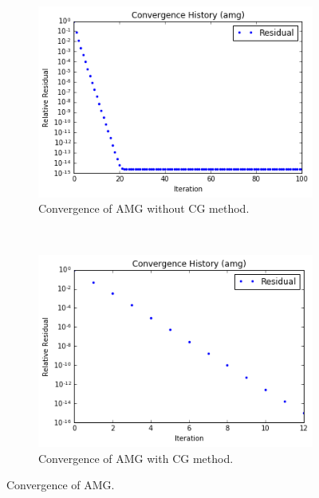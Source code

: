 \documentclass[a4paper,12pt]{article}
\begin{document}
\begin{figure}[h!]
  \centering
  \begin{subfigure}[b]{0.8\textwidth}
    \includegraphics[width=\textwidth]{hpsc_final_nocg.png}
    \caption{Convergence of AMG without CG method.}
  \end{subfigure}
~
\begin{subfigure}[b]{0.8\textwidth}
    \includegraphics[width=\textwidth]{hpsc_final_cg.png}
    \caption{Convergence of AMG with CG method.}
  \end{subfigure}
  \caption{Convergence of AMG.}
\end{figure}
\end{document}
